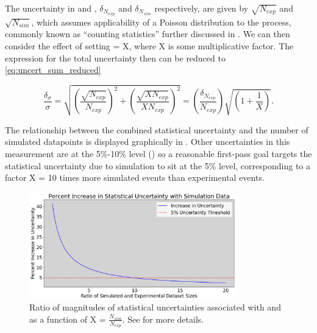 
    The uncertainty in \Nexp and \Nsim, $\delta_{N_{exp}}$ and $\delta_{N_{sim}}$ respectively, are given by $\sqrt{N_{exp}}$ and $\sqrt{N_{sim}}$, which assumes applicability of a Poisson distribution to the process, commonly known as ``counting statistics'' further discussed in \parencite{Knoll2000RadiationMeasurement}. We can then consider the effect of setting \Nsim = X\Nexp, where X is some multiplicative factor. The expression for the total uncertainty then can be reduced to \eqref{eq:uncert_sum_reduced}

        \begin{equation}\label{eq:uncert_sum_reduced}
               {\frac{\delta_{\sigma}}{\sigma} = \sqrt{ \left( \frac{ \sqrt{ N_{exp}} } { N_{exp}} \right)^2  +  \left( \frac{ \sqrt{ X N_{exp}} } { X N_{exp}} \right)^2     } =  \left(\frac{\delta_{N_{exp}}}{N_{exp}} \right) \sqrt{ \left(1+\frac{1}{X} \right)}}.
        \end{equation} 

    The relationship between the combined statistical uncertainty and the number of simulated datapoints is displayed graphically in . Other uncertainties in this measurement are at the 5\%-10\% level () so a reasonable first-pass goal targets the statistical uncertainty due to simulation to sit at the 5\% level, corresponding to a factor X = 10 times more simulated events than experimental events. 
    
    \begin{figure}[htb]
        \centering
        \includegraphics[width=0.8\textwidth]{Chapters/Ch3-Simulations/overview/pics/uncertainty_increase_rectangle.png}
        \caption[Comparison between Experimental and Statistical Counting Uncertainties]{Ratio of magnitudes of statistical uncertainties associated with \Nsim and \Nexp as a function of X = $\frac{N_{sim}}{N_{exp}}$. See  for more details.}
        \label{fig:simulation_stats_increase}
    \end{figure}


